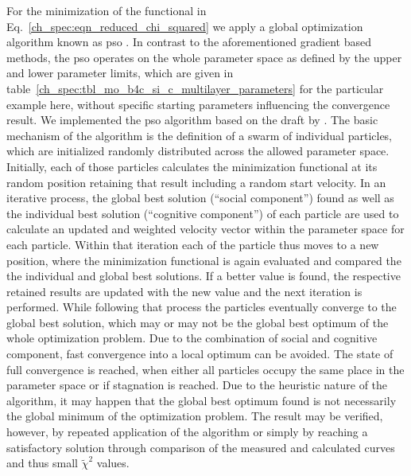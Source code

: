 For the minimization of the functional in Eq.~\eqref{ch_spec:eqn_reduced_chi_squared} we apply a global optimization algorithm known as \gls{pso} \cite{kennedy_particle_2011}. In contrast to the aforementioned gradient based methods, the \gls{pso} operates on the whole parameter space as defined by the upper and lower parameter limits, which are given in table~\ref{ch_spec:tbl_mo_b4c_si_c_multilayer_parameters} for the particular example here, without specific starting parameters influencing the convergence result. We implemented the \gls{pso} algorithm based on the draft by \textcite{carlisle_off--shelf_2001}. The basic mechanism of the algorithm is the definition of a swarm of individual particles, which are initialized randomly distributed across the allowed parameter space. Initially, each of those particles calculates the minimization functional at its random position retaining that result including a random start velocity. In an iterative process, the global best solution (``social component'') found as well as the individual best solution (``cognitive component'') of each particle are used to calculate an updated and weighted velocity vector within the parameter space for each particle. Within that iteration each of the particle thus moves to a new position, where the minimization functional is again evaluated and compared the the individual and global best solutions. If a better value is found, the respective retained results are updated with the new value and the next iteration is performed. While following that process the particles eventually converge to the global best solution, which may or may not be the global best optimum of the whole optimization problem. Due to the combination of social and cognitive component, fast convergence into a local optimum can be avoided. The state of full convergence is reached, when either all particles occupy the same place in the parameter space or if stagnation is reached. Due to the heuristic nature of the algorithm, it may happen that the global best optimum found is not necessarily the global minimum of the optimization problem. The result may be verified, however, by repeated application of the algorithm or simply by reaching a satisfactory solution through comparison of the measured and calculated curves and thus small $\tilde{\chi}^2$ values.

